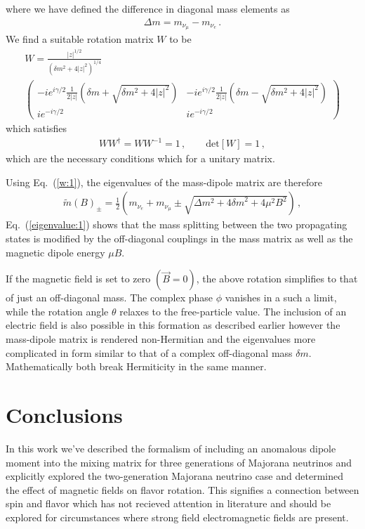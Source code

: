 \documentclass[addchapnum]{ws-rv961x669} %
\newcommand{\req}[1]{Eq.~(\ref{#1})}
\begin{document}
where we have defined the difference in diagonal mass elements as
\begin{align}
    \Delta m = m_{\nu_{\mu}} - m_{\nu_{e}}\,.
\end{align}
We find a suitable rotation matrix $W$ to be
\begin{multline}
    \label{w:1}
    W=\frac{|z|^{1/2}}{\left(\delta m^{2} + 4|z|^{2}\right)^{1/4}}\\
    \begin{pmatrix}
        -ie^{i\gamma/2}\frac{1}{2|z|}\left(\delta m + \sqrt{\delta m^{2} + 4|z|^{2}}\right) & -ie^{i\gamma/2}\frac{1}{2|z|}\left(\delta m - \sqrt{\delta m^{2} + 4|z|^{2}}\right)\\
        ie^{-i\gamma/2} & ie^{-i\gamma/2}        
    \end{pmatrix}
\end{multline}
which satisfies
\begin{align}
    WW^{\dag}=WW^{-1}=1\,,\qquad \mathrm{det}[W]=1\,,
\end{align}
which are the necessary conditions which for a unitary matrix.

Using \req{w:1}, the eigenvalues of the mass-dipole matrix are therefore
\begin{align}
    \label{eigenvalue:1}
    \tilde{m}(B)_{\pm}=\frac{1}{2}\left(m_{\nu_{e}}+m_{\nu_{\mu}}\pm\sqrt{\Delta m^{2}+4{\delta m}^{2}+4\mu^{2}B^{2}}\right)\,,
\end{align}
\req{eigenvalue:1} shows that the mass splitting between the two propagating states is modified by the off-diagonal couplings in the mass matrix as well as the magnetic dipole energy $\mu B$.

If the magnetic field is set to zero $(\vec{B}=0)$, the above rotation simplifies to that of just an off-diagonal mass. The complex phase $\phi$ vanishes in a such a limit, while the rotation angle $\theta$ relaxes to the free-particle value. The inclusion of an electric field is also possible in this formation as described earlier however the mass-dipole matrix is rendered non-Hermitian and the eigenvalues more complicated in form similar to that of a complex off-diagonal mass ${\delta m}$. Mathematically both break Hermiticity in the same manner.


\section{Conclusions}
In this work we've described the formalism of including an anomalous dipole moment into the mixing matrix for three generations of Majorana neutrinos and explicitly explored the two-generation Majorana neutrino case and determined the effect of magnetic fields on flavor rotation. This signifies a connection between spin and flavor which has not recieved attention in literature and should be explored for circumstances where strong field electromagnetic fields are present.
\end{document}
